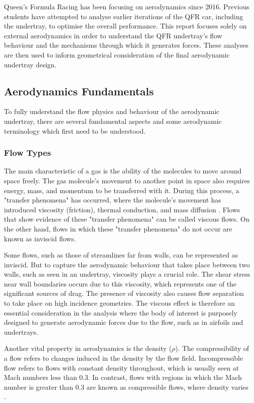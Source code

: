 \noindent Queen's Formula Racing has been focusing on aerodynamics since 2016. Previous students have attempted to analyse earlier iterations of the QFR car, including the undertray, to optimise the overall performance. This report focuses solely on external aerodynamics in order to understand the QFR undertray's flow behaviour and the mechanisms through which it generates forces. These analyses are then used to inform geometrical consideration of the final aerodynamic undertray design.

\subsection{Aerodynamics Fundamentals}
To fully understand the flow physics and behaviour of the aerodynamic undertray, there are several fundamental aspects and some aerodynamic terminology which first need to be understood.

\subsubsection{Flow Types}
The main characteristic of a gas is the ability of the molecules to move around space freely. The gas molecule's movement to another point in space also requires energy, mass, and momentum to be transferred with it. During this process, a "transfer phenomena" has occurred, where the molecule's movement has introduced viscosity (friction), thermal conduction, and mass diffusion \cite{Anderson2010FundamentalsAerodynamics}. Flows that show evidence of these "transfer phenomena" can be called viscous flows. On the other hand, flows in which these "transfer phenomena" do not occur are known as inviscid flows.

\noindent Some flows, such as those of streamlines far from walls, can be represented as inviscid. But to capture the aerodynamic behaviour that takes place between two walls, such as seen in an undertray, viscosity plays a crucial role. The shear stress near wall boundaries occurs due to this viscosity, which represents one of the significant sources of drag. The presence of viscosity also causes flow separation to take place on high incidence geometries. The viscous effect is therefore an essential consideration in the analysis where the body of interest is purposely designed to generate aerodynamic forces due to the flow, such as in airfoils and undertrays.

\noindent Another vital property in aerodynamics is the density ($\rho$). The compressibility of a flow refers to changes induced in the density by the flow field. Incompressible flow refers to flows with constant density throughout, which is usually seen at Mach numbers less than 0.3. In contrast, flows with regions in which the Mach number is greater than 0.3 are known as compressible flows, where density varies \cite{Anderson2010FundamentalsAerodynamics}.

